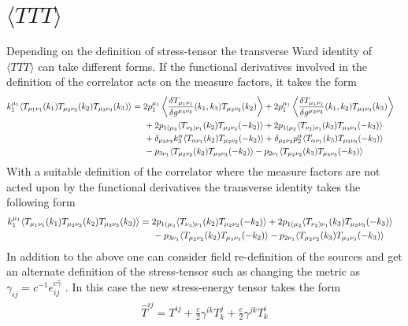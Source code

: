 \documentclass[a4paper,11pt]{article}
\begin{document}
  \section*{$\langle TTT\rangle $}
 Depending on the definition of stress-tensor the transverse Ward identity of $\langle TTT\rangle$ can take different forms. If the functional derivatives involved in the definition of the correlator acts on the measure factors, it takes the form \cite{Bzowski:2013sza} 
%
\begin{align}
k_1^{\mu_1}\langle T_{\mu_1\nu_1}(k_1)T_{\mu_2\nu_2}(k_2)T_{\mu_3\nu_3}(k_3)\rangle&=2p_1^{\mu_1}\left\langle \frac{\delta T_{\mu_1\nu_1}}{\delta g^{\mu_3\nu_3}}(k_1,k_3)T_{\mu_2\nu_2}(k_2)\right\rangle+2p_1^{\mu_1}\left\langle \frac{\delta T_{\mu_1\nu_1}}{\delta g^{\mu_2\nu_2}}(k_1,k_2)T_{\mu_3\nu_3}(k_3)\right\rangle\cr
&\hspace{.5cm}+2p_{1(\mu_3}\langle T_{\nu_3)\nu_1}(k_2)T_{\mu_2\nu_2}(-k_2)\rangle+2p_{1(\mu_2}\langle T_{\nu_2)\nu_1}(k_3)T_{\mu_3\nu_3}(-k_3)\rangle\cr
&\hspace{.5cm}+\delta_{\mu_3\nu_3}k_3^\alpha\langle T_{\alpha\nu_1}(k_2)T_{\mu_2\nu_2}(-k_2)\rangle+\delta_{\mu_2\nu_2}p_2^\alpha\langle T_{\alpha\nu_1}(k_3)T_{\mu_3\nu_3}(-k_3)\rangle\cr
&\hspace{.5cm}-p_{3\nu_1}\langle T_{\mu_2\nu_2}(k_2)T_{\mu_3\nu_3}(-k_2)\rangle-p_{2\nu_1}\langle T_{\mu_2\nu_2}(k_3)T_{\mu_3\nu_3}(-k_3)\rangle
\end{align}
%
With a suitable definition of the correlator where the measure factors are not acted upon by the functional derivatives the transverse identity takes the following form \cite{Bzowski:2017poo}
\begin{align}
k_1^{\mu_1}\langle T_{\mu_1\nu_1}(k_1)T_{\mu_2\nu_2}(k_2)T_{\mu_3\nu_3}(k_3)\rangle&=2p_{1(\mu_3}\langle T_{\nu_3)\nu_1}(k_2)T_{\mu_2\nu_2}(-k_2)\rangle+2p_{1(\mu_2}\langle T_{\nu_2)\nu_1}(k_3)T_{\mu_3\nu_3}(-k_3)\rangle\cr
&\hspace{.5cm}-p_{3\nu_1}\langle T_{\mu_2\nu_2}(k_2)T_{\mu_3\nu_3}(-k_2)\rangle-p_{2\nu_1}\langle T_{\mu_2\nu_2}(k_3)T_{\mu_3\nu_3}(-k_3)\rangle
\end{align}
%
In addition to the above one can consider field re-definition of the sources and get an alternate definition of the stress-tensor such as changing the metric as $\gamma_{ij}=c^{-1}e^{c\hat\gamma}_{ij}$ \cite{Farrow:2018yni}. In this case the new stress-energy tensor takes the form \cite{Baumann:2020dch, Farrow:2018yni}
\begin{align}
\hat T^{ij}=T^{ij}+\frac c2\gamma^{ik}T_{k}^j+\frac c2\gamma^{jk}T^{i}_k
\end{align}
\end{document}

